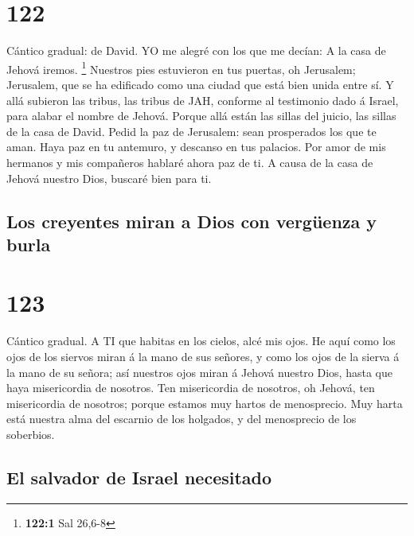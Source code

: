 \hypertarget{section-121}{%
\section{122}\label{section-121}}

 Cántico gradual: de David. YO me alegré con los que me
decían: A la casa de Jehová iremos. \footnote{\textbf{122:1} Sal 26,6-8}
 Nuestros pies estuvieron en tus puertas, oh Jerusalem;
 Jerusalem, que se ha edificado como una ciudad que está
bien unida entre sí.  Y allá subieron las tribus, las tribus
de JAH, conforme al testimonio dado á Israel, para alabar el nombre de
Jehová.  Porque allá están las sillas del juicio, las sillas
de la casa de David.  Pedid la paz de Jerusalem: sean
prosperados los que te aman.  Haya paz en tu antemuro, y
descanso en tus palacios.  Por amor de mis hermanos y mis
compañeros hablaré ahora paz de ti.  A causa de la casa de
Jehová nuestro Dios, buscaré bien para ti.

\hypertarget{los-creyentes-miran-a-dios-con-verguxfcenza-y-burla}{%
\subsection{Los creyentes miran a Dios con vergüenza y
burla}\label{los-creyentes-miran-a-dios-con-verguxfcenza-y-burla}}

\hypertarget{section-122}{%
\section{123}\label{section-122}}

 Cántico gradual. A TI que habitas en los cielos, alcé mis
ojos.  He aquí como los ojos de los siervos miran á la mano
de sus señores, y como los ojos de la sierva á la mano de su señora; así
nuestros ojos miran á Jehová nuestro Dios, hasta que haya misericordia
de nosotros.  Ten misericordia de nosotros, oh Jehová, ten
misericordia de nosotros; porque estamos muy hartos de menosprecio.
 Muy harta está nuestra alma del escarnio de los holgados, y
del menosprecio de los soberbios.

\hypertarget{el-salvador-de-israel-necesitado}{%
\subsection{El salvador de Israel
necesitado}\label{el-salvador-de-israel-necesitado}}

